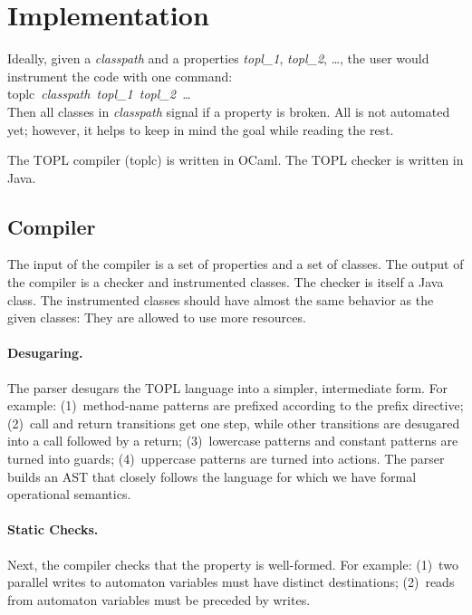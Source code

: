 \documentclass{article} %
\newcommand{\sfline}[1]{\\\hbox{\hspace{3em}\textsf{#1}}\\}
\begin{document}
\section{Implementation} %


Ideally, given a \textit{classpath} and a properties \textit{topl\_1}, \textit{topl\_2}, \dots, the user would instrument the code with one command:
\sfline{toplc \textit{classpath topl\_1 topl\_2 \dots}}
Then all classes in \textit{classpath} signal if a property is broken.
All is not automated yet; however, it helps to keep in mind the goal while reading the rest.

The TOPL compiler (\textsf{toplc}) is written in OCaml.
The TOPL checker is written in Java.

\subsection{Compiler} %

The input of the compiler is a set of properties and a set of classes.
The output of the compiler is a checker and instrumented classes.
The checker is itself a Java class.
The instrumented classes should have almost the same behavior as the given classes:
They are allowed to use more resources.

\paragraph{Desugaring.}
The parser desugars the TOPL language into a simpler, intermediate form.
For example:
(1)~method-name patterns are prefixed according to the \textsf{prefix} directive;
(2)~\textsf{call} and \textsf{return} transitions get one step, while other transitions are desugared into a \textsf{call} followed by a \textsf{return};
(3)~lowercase patterns and constant patterns are turned into guards;
(4)~uppercase patterns are turned into actions.
The parser builds an AST that closely follows the language for which we have formal operational semantics.

\paragraph{Static Checks.}
Next, the compiler checks that the property is well-formed.
For example:
(1)~two parallel writes to automaton variables must have distinct destinations;
(2)~reads from automaton variables must be preceded by writes.
\end{document}
